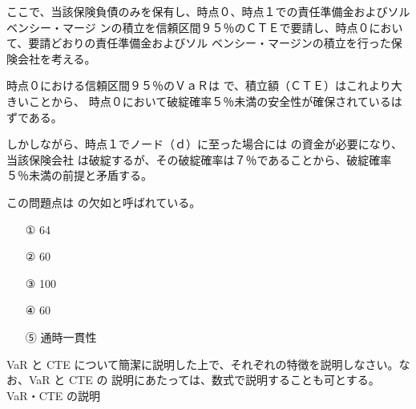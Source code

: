 \documentclass[report,gutter=10mm,fore-edge=10mm,uplatex,dvipdfmx]{jlreq}
\begin{document}
\vspace{1zh}
ここで、当該保険負債のみを保有し、時点０、時点１での責任準備金およびソルベンシー・マージ
ンの積立を信頼区間９５％のＣＴＥで要請し、時点０において、要請どおりの責任準備金およびソル
ベンシー・マージンの積立を行った保険会社を考える。

時点０における信頼区間９５％のＶａＲは
で、積立額（ＣＴＥ）はこれより大きいことから、
時点０において破綻確率５％未満の安全性が確保されているはずである。

しかしながら、時点１でノード（ｄ）に至った場合には
の資金が必要になり、当該保険会社
は破綻するが、その破綻確率は７％であることから、破綻確率５％未満の前提と矛盾する。

この問題点は
の欠如と呼ばれている。
\answer{}
\begin{itemize}
\item[ ① ]  64 
\item[ ② ]  60 
\item[ ③ ]  100 
\item[ ④ ]  60 
\item[ ⑤ ]  通時一貫性
\end{itemize}

VaR と CTE について簡潔に説明した上で、それぞれの特徴を説明しなさい。なお、VaR と CTE の
説明にあたっては、数式で説明することも可とする。
\answer{}
VaR・CTE の説明
\end{document}
